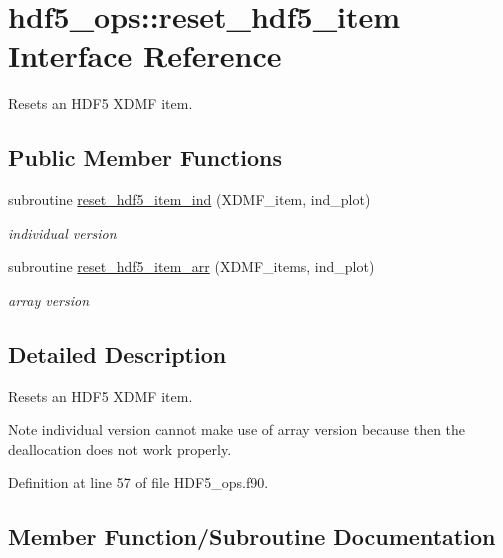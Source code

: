 \hypertarget{interfacehdf5__ops_1_1reset__hdf5__item}{}\section{hdf5\+\_\+ops\+:\+:reset\+\_\+hdf5\+\_\+item Interface Reference}
\label{interfacehdf5__ops_1_1reset__hdf5__item}


Resets an H\+D\+F5 X\+D\+MF item.  


\subsection*{Public Member Functions}
\begin{DoxyCompactItemize}
\item 
subroutine \hyperlink{interfacehdf5__ops_1_1reset__hdf5__item_a6d3555adb7940978c93a259be0ece2c1}{reset\+\_\+hdf5\+\_\+item\+\_\+ind} (X\+D\+M\+F\+\_\+item, ind\+\_\+plot)
\begin{DoxyCompactList}\small\item\em individual version \end{DoxyCompactList}\item 
subroutine \hyperlink{interfacehdf5__ops_1_1reset__hdf5__item_aac823723bdd8de3557acc3fb224ac593}{reset\+\_\+hdf5\+\_\+item\+\_\+arr} (X\+D\+M\+F\+\_\+items, ind\+\_\+plot)
\begin{DoxyCompactList}\small\item\em array version \end{DoxyCompactList}\end{DoxyCompactItemize}


\subsection{Detailed Description}
Resets an H\+D\+F5 X\+D\+MF item. 

\begin{DoxyNote}{Note}
individual version cannot make use of array version because then the deallocation does not work properly. 
\end{DoxyNote}


Definition at line 57 of file H\+D\+F5\+\_\+ops.\+f90.



\subsection{Member Function/\+Subroutine Documentation}
\mbox{\label{interfacehdf5__ops_1_1reset__hdf5__item_aac823723bdd8de3557acc3fb224ac593}} 
